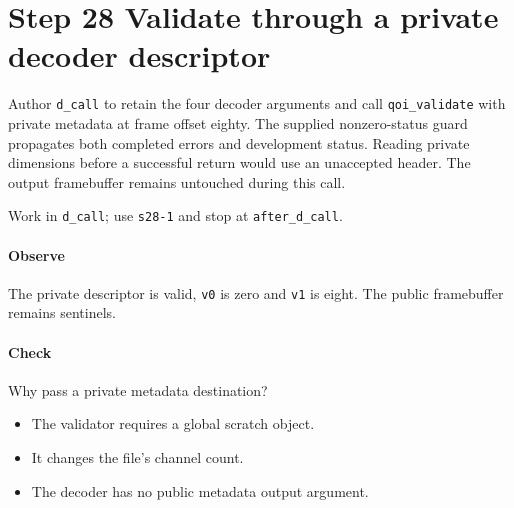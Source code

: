 \section{Step 28 Validate through a private decoder descriptor}\label{qoi-s28}
Author \texttt{d\_call} to retain the four decoder arguments and call \texttt{qoi\_validate} with private metadata at frame offset eighty. The supplied nonzero-status guard propagates both completed errors and development status. Reading private dimensions before a successful return would use an unaccepted header. The output framebuffer remains untouched during this call.

Work in \texttt{d\_call}; use \texttt{s28-1} and stop at \texttt{after\_d\_call}.

\paragraph{Observe} The private descriptor is valid, \texttt{v0} is zero and \texttt{v1} is eight. The public framebuffer remains sentinels.

\paragraph{Check} Why pass a private metadata destination?
\begin{itemize}
  \item[A.] The validator requires a global scratch object.
  \item[B.] It changes the file’s channel count.
  \item[C.] The decoder has no public metadata output argument.
\end{itemize}
